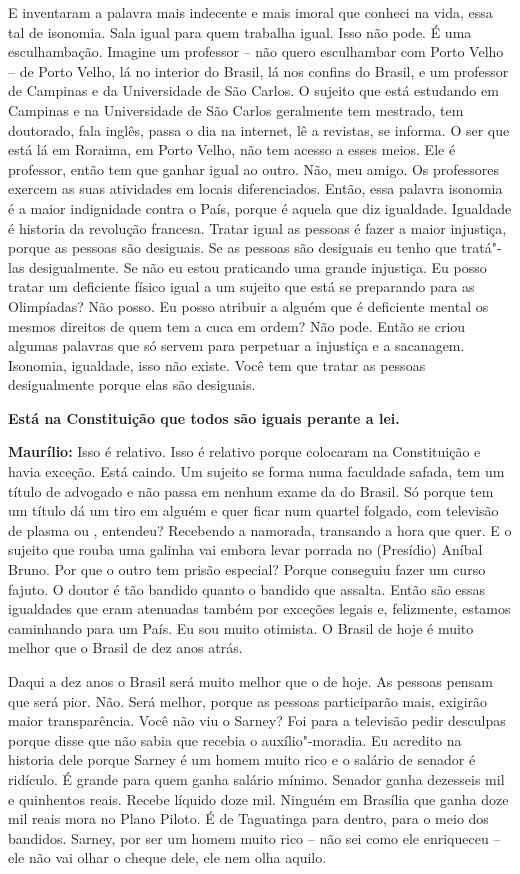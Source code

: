 E inventaram a palavra mais indecente e mais imoral que conheci na vida,
essa tal de isonomia. Sala igual para quem trabalha igual. Isso não
pode. É uma esculhambação. Imagine um professor -- não quero esculhambar
com Porto Velho -- de Porto Velho, lá no interior do Brasil, lá nos
confins do Brasil, e um professor de Campinas e da Universidade de São
Carlos. O sujeito que está estudando em Campinas e na Universidade de
São Carlos geralmente tem mestrado, tem doutorado, fala inglês, passa o
dia na internet, lê a revistas, se informa. O ser que está lá em
Roraima, em Porto Velho, não tem acesso a esses meios. Ele é professor,
então tem que ganhar igual ao outro. Não, meu amigo. Os professores
exercem as suas atividades em locais diferenciados. Então, essa palavra
isonomia é a maior indignidade contra o País, porque é aquela que diz
igualdade. Igualdade é historia da revolução francesa. Tratar igual as
pessoas é fazer a maior injustiça, porque as pessoas são desiguais. Se
as pessoas são desiguais eu tenho que tratá"-las desigualmente. Se não eu
estou praticando uma grande injustiça. Eu posso tratar um deficiente
físico igual a um sujeito que está se preparando para as Olimpíadas? Não
posso. Eu posso atribuir a alguém que é deficiente mental os mesmos
direitos de quem tem a cuca em ordem? Não pode. Então se criou algumas
palavras que só servem para perpetuar a injustiça e a sacanagem.
Isonomia, igualdade, isso não existe. Você tem que tratar as pessoas
desigualmente porque elas são desiguais.

\textbf{Está na Constituição que todos são iguais perante a lei.}

\textbf{Maurílio:} Isso é relativo. Isso é relativo porque colocaram na
Constituição e havia exceção. Está caindo. Um sujeito se forma numa
faculdade safada, tem um título de advogado e não passa em nenhum exame
da  do Brasil. Só porque tem um título dá um tiro em alguém e quer
ficar num quartel folgado, com televisão de plasma ou , entendeu?
Recebendo a namorada, transando a hora que quer. E o sujeito que rouba
uma galinha vai embora levar porrada no (Presídio) Aníbal Bruno. Por que
o outro tem prisão especial? Porque conseguiu fazer um curso fajuto. O
doutor é tão bandido quanto o bandido que assalta. Então são essas
igualdades que eram atenuadas também por exceções legais e, felizmente,
estamos caminhando para um País. Eu sou muito otimista. O Brasil de hoje
é muito melhor que o Brasil de dez anos atrás.

Daqui a dez anos o Brasil será muito melhor que o de hoje. As pessoas
pensam que será pior. Não. Será melhor, porque as pessoas participarão
mais, exigirão maior transparência. Você não viu o Sarney? Foi para a
televisão pedir desculpas porque disse que não sabia que recebia o
auxílio"-moradia. Eu acredito na historia dele porque Sarney é um homem
muito rico e o salário de senador é ridículo. É grande para quem ganha
salário mínimo. Senador ganha dezesseis mil e quinhentos reais. Recebe
líquido doze mil. Ninguém em Brasília que ganha doze mil reais mora no
Plano Piloto. É de Taguatinga para dentro, para o meio dos bandidos.
Sarney, por ser um homem muito rico -- não sei como ele enriqueceu --
ele não vai olhar o cheque dele, ele nem olha aquilo.

